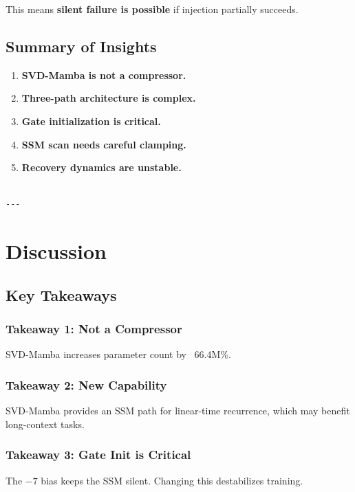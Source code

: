 This means \textbf{silent failure is possible} if injection partially succeeds.

\subsection{Summary of Insights}

\begin{enumerate}
\item \textbf{SVD-Mamba is not a compressor.}
\item \textbf{Three-path architecture is complex.}
\item \textbf{Gate initialization is critical.}
\item \textbf{SSM scan needs careful clamping.}
\item \textbf{Recovery dynamics are unstable.}
\end{enumerate}
\begin{lstlisting}

---
\end{lstlisting}


\section{Discussion}

\subsection{Key Takeaways}

\subsubsection{Takeaway 1: Not a Compressor}

SVD-Mamba increases parameter count by ~66.4M\%.

\subsubsection{Takeaway 2: New Capability}

SVD-Mamba provides an SSM path for linear-time recurrence, which may 
benefit long-context tasks.

\subsubsection{Takeaway 3: Gate Init is Critical}

The $-7$ bias keeps the SSM silent. Changing this destabilizes training.

